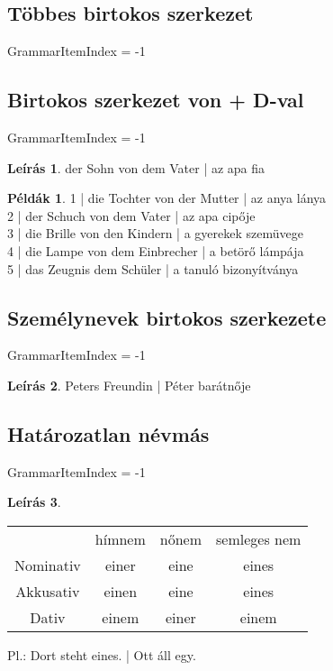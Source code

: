 \documentclass{article}
\theoremstyle{definition}
\newtheorem*{exmp}{Példák}
\newtheorem*{desc}{Leírás}
\begin{document}
\subsection{Többes birtokos szerkezet}

GrammarItemIndex = -1

\subsection{Birtokos szerkezet von + D-val}

GrammarItemIndex = -1

\begin{desc}
der Sohn von dem Vater | az apa fia
\end{desc}

\begin{exmp}
1 | die Tochter von der Mutter | az anya lánya\\
2 | der Schuch von dem Vater | az apa cipője\\
3 | die Brille von den Kindern | a gyerekek szemüvege\\
4 | die Lampe von dem Einbrecher | a betörő lámpája\\
5 | das Zeugnis dem  Schüler | a tanuló bizonyítványa\\
\end{exmp}

\subsection{Személynevek birtokos szerkezete}

GrammarItemIndex = -1

\begin{desc}
Peters Freundin | Péter barátnője
\end{desc}

\subsection{Határozatlan névmás}

GrammarItemIndex = -1

\begin{desc}
\begin{tabular}{cccc}
 & hímnem & nőnem & semleges nem \\
 Nominativ & einer & eine & eines \\
 Akkusativ & einen & eine & eines \\
 Dativ & einem & einer & einem \\
\end{tabular}

Pl.: Dort steht eines. | Ott áll egy.
\end{desc}
\end{document}
